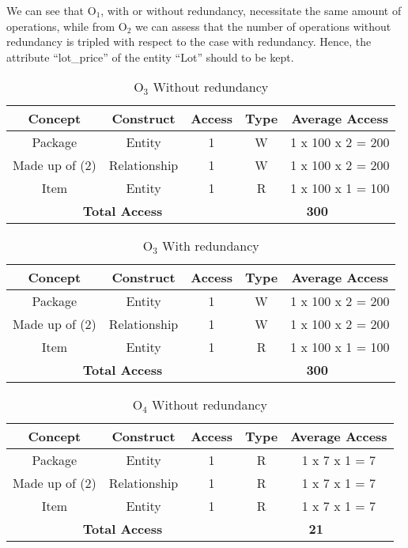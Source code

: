 We can see that $ \textrm{O}_\textrm{1} $, with or without redundancy, necessitate the same amount of operations, while from $ \textrm{O}_\textrm{2} $ we can assess that the number of operations without redundancy is tripled with respect to the case with redundancy. Hence, the attribute ``lot\_price'' of the entity ``Lot'' should to be kept.
\begin{table}[!h]\caption{	$ \textrm{O}_\textrm{3} $ Without redundancy }
	\begin{center}
		\begin{tabular}{| c | c | c | c | c |}
			\hline
			\textbf{Concept} & \textbf{Construct} & \textbf{Access} & \textbf{Type} & \textbf{Average Access} \\ \hline
			Package & Entity & 1 & W & 1 x 100 x 2 = 200 \\ \hline
			Made up of (2) & Relationship & 1 & W & 1 x 100 x 2 = 200 \\ \hline		Item & Entity & 1 & R & 1 x 100 x 1 = 100 \\ \hline		
			\multicolumn{3}{|c|}{\textbf{Total Access}} & \multicolumn{2}{|c|}{\textbf{300}} \\ \hline
		\end{tabular}
	\end{center}
\end{table}
\newpage
\begin{table}[!h]\caption{	$ \textrm{O}_\textrm{3} $ With redundancy}
	\begin{center}
		\begin{tabular}{| c | c | c | c | c |}
			\hline
			\textbf{Concept} & \textbf{Construct} & \textbf{Access} & \textbf{Type} & \textbf{Average Access} \\ \hline
			Package & Entity & 1 & W & 1 x 100 x 2 = 200 \\ \hline
			Made up of (2) & Relationship & 1 & W & 1 x 100 x 2 = 200 \\ \hline		Item & Entity & 1 & R & 1 x 100 x 1 = 100 \\ \hline		
			\multicolumn{3}{|c|}{\textbf{Total Access}} & \multicolumn{2}{|c|}{\textbf{300}} \\ \hline
		\end{tabular}
	\end{center}
\end{table}
\begin{table}[!h]\caption{	$ \textrm{O}_\textrm{4} $ Without redundancy }
	\begin{center}
		\begin{tabular}{| c | c | c | c | c |}
			\hline
			\textbf{Concept} & \textbf{Construct} & \textbf{Access} & \textbf{Type} & \textbf{Average Access} \\ \hline
			Package & Entity & 1 & R & 1 x 7 x 1 = 7 \\ \hline
			Made up of (2) & Relationship & 1 & R & 1 x 7 x 1 = 7 \\ \hline		Item & Entity & 1 & R & 1 x 7 x 1 = 7 \\ \hline		
			\multicolumn{3}{|c|}{\textbf{Total Access}} & \multicolumn{2}{|c|}{\textbf{21}} \\ \hline
		\end{tabular}
	\end{center}
\end{table}
